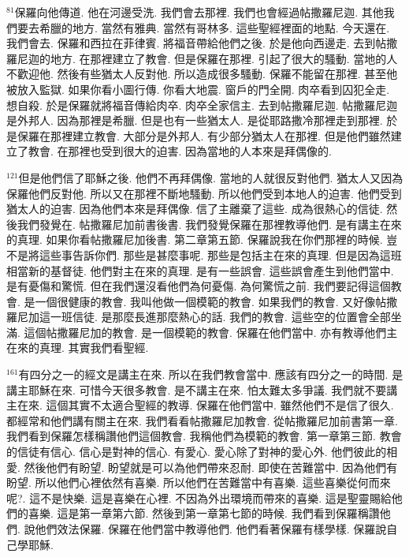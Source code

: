 \documentclass{book}
\begin{document}
$^{81}$保羅向他傳道.
他在河邊受洗.
我們會去那裡.
我們也會經過帖撒羅尼迦.
其他我們要去希臘的地方.
當然有雅典.
當然有哥林多.
這些聖經裡面的地點.
今天還在.
我們會去.
保羅和西拉在菲律賓.
將福音帶給他們之後.
於是他向西邊走.
去到帖撒羅尼迦的地方.
在那裡建立了教會.
但是保羅在那裡.
引起了很大的騷動.
當地的人不歡迎他.
然後有些猶太人反對他.
所以造成很多騷動.
保羅不能留在那裡.
甚至他被放入監獄.
如果你看小圖行傳.
你看大地震.
窗戶的門全開.
肉卒看到囚犯全走.
想自殺.
於是保羅就將福音傳給肉卒.
肉卒全家信主.
去到帖撒羅尼迦.
帖撒羅尼迦是外邦人.
因為那裡是希臘.
但是也有一些猶太人.
是從耶路撒冷那裡走到那裡.
於是保羅在那裡建立教會.
大部分是外邦人.
有少部分猶太人在那裡.
但是他們雖然建立了教會.
在那裡也受到很大的迫害.
因為當地的人本來是拜偶像的.

$^{121}$但是他們信了耶穌之後.
他們不再拜偶像.
當地的人就很反對他們.
猶太人又因為保羅他們反對他.
所以又在那裡不斷地騷動.
所以他們受到本地人的迫害.
他們受到猶太人的迫害.
因為他們本來是拜偶像.
信了主離棄了這些.
成為很熱心的信徒.
然後我們發覺在.
帖撒羅尼加前書後書.
我們發覺保羅在那裡教導他們.
是有講主在來的真理.
如果你看帖撒羅尼加後書.
第二章第五節.
保羅說我在你們那裡的時候.
豈不是將這些事告訴你們.
那些是甚麼事呢.
那些是包括主在來的真理.
但是因為這班相當新的基督徒.
他們對主在來的真理.
是有一些誤會.
這些誤會產生到他們當中.
是有憂傷和驚慌.
但在我們還沒看他們為何憂傷.
為何驚慌之前.
我們要記得這個教會.
是一個很健康的教會.
我叫他做一個模範的教會.
如果我們的教會.
又好像帖撒羅尼加這一班信徒.
是那麼長進那麼熱心的話.
我們的教會.
這些空的位置會全部坐滿.
這個帖撒羅尼加的教會.
是一個模範的教會.
保羅在他們當中.
亦有教導他們主在來的真理.
其實我們看聖經.

$^{161}$有四分之一的經文是講主在來.
所以在我們教會當中.
應該有四分之一的時間.
是講主耶穌在來.
可惜今天很多教會.
是不講主在來.
怕太難太多爭議.
我們就不要講主在來.
這個其實不太適合聖經的教導.
保羅在他們當中.
雖然他們不是信了很久.
都經常和他們講有關主在來.
我們看看帖撒羅尼加教會.
從帖撒羅尼加前書第一章.
我們看到保羅怎樣稱讚他們這個教會.
我稱他們為模範的教會.
第一章第三節.
教會的信徒有信心.
信心是對神的信心.
有愛心.
愛心除了對神的愛心外.
他們彼此的相愛.
然後他們有盼望.
盼望就是可以為他們帶來忍耐.
即使在苦難當中.
因為他們有盼望.
所以他們心裡依然有喜樂.
所以他們在苦難當中有喜樂.
這些喜樂從何而來呢?.
這不是快樂.
這是喜樂在心裡.
不因為外出環境而帶來的喜樂.
這是聖靈賜給他們的喜樂.
這是第一章第六節.
然後到第一章第七節的時候.
我們看到保羅稱讚他們.
說他們效法保羅.
保羅在他們當中教導他們.
他們看著保羅有樣學樣.
保羅說自己學耶穌.
\end{document}
